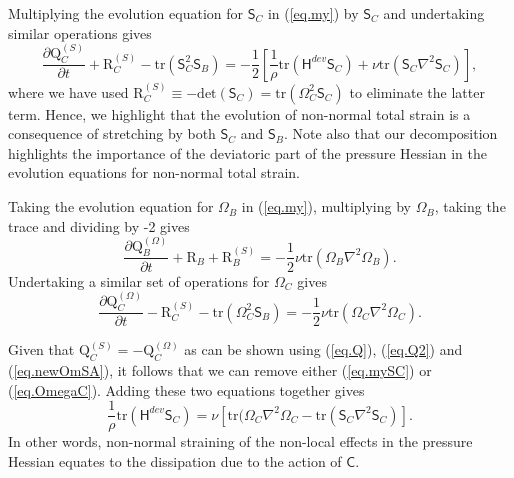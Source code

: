 \documentclass[preprint,amssymb,amsmath,aip,cha]{revtex4-1}
\begin{document}
Multiplying the evolution equation for $\mathsf{S}_{C}$ in (\ref{eq.my}) by $\mathsf{S}_{C}$ and undertaking similar operations gives
\begin{equation}
\frac{\partial \mbox{Q}^{(S)}_{C}}{\partial t} + \mbox{R}^{(S)}_{C} -\mbox{tr}(\mathsf{S}_{C}^{2}\mathsf{S}_{B}) = -\frac{1}{2}\left[\frac{1}{\rho} \mbox{tr}(\mathsf{H}^{dev}\mathsf{S}_{C}) + \nu \mbox{tr}(\mathsf{S}_{C} \nabla^{2} \mathsf{S}_{C})\right],
\label{eq.mySC}
\end{equation}
where we have used $\mbox{R}^{(S)}_{C} \equiv -\mbox{det}(\mathsf{S}_{C}) = \mbox{tr}(\mathsf{\Omega}_{C}^{2}\mathsf{S}_{C})$ to eliminate the latter term. Hence, we highlight that the evolution of non-normal total strain is a consequence of stretching by both $\mathsf{S}_{C}$ and $\mathsf{S}_{B}$. Note also that our decomposition highlights the importance of the deviatoric part of the pressure Hessian in the evolution equations for non-normal total strain.

Taking the evolution equation for $\mathsf{\Omega}_{B}$  in (\ref{eq.my}), multiplying by $\mathsf{\Omega}_{B}$, taking the trace and dividing by -2 gives
\begin{equation}
\label{eq.OmegaB}
\frac{\partial \mbox{Q}^{(\Omega)}_{B}}{\partial t} + \mbox{R}_{B} + \mbox{R}^{(S)}_{B} = -\frac{1}{2} \nu \mbox{tr}(\mathsf{\Omega}_{B} \nabla^{2} \mathsf{\Omega}_{B}).
\end{equation}
Undertaking a similar set of operations for $\mathsf{\Omega}_{C}$ %
gives
\begin{equation}
\frac{\partial \mbox{Q}^{(\Omega)}_{C}}{\partial t} - \mbox{R}^{(S)}_{C} - \mbox{tr}(\mathsf{\Omega}_{C}^{2}\mathsf{S}_{B}) = -\frac{1}{2}\nu \mbox{tr}(\mathsf{\Omega}_{C} \nabla^{2} \mathsf{\Omega}_{C}).
\label{eq.OmegaC}
\end{equation}

Given that $\mbox{Q}^{(S)}_{C} = -\mbox{Q}^{(\Omega)}_{C}$ as can be shown using (\ref{eq.Q}), (\ref{eq.Q2}) and  (\ref{eq.newOmSA}), it follows that we can remove either (\ref{eq.mySC}) or (\ref{eq.OmegaC}). Adding these two equations together gives 
\begin{equation}
\frac{1}{\rho} \mbox{tr}(\mathsf{H}^{dev}\mathsf{S}_{C}) = \nu [\mbox{tr}(\mathsf{\Omega}_{C} \nabla^{2} \mathsf{\Omega}_{C} - \mbox{tr}(\mathsf{S}_{C} \nabla^{2} \mathsf{S}_{C})].
\end{equation}
In other words, non-normal straining of the non-local effects in the pressure Hessian equates to the dissipation due to the action of $\mathsf{C}$.
\end{document}
